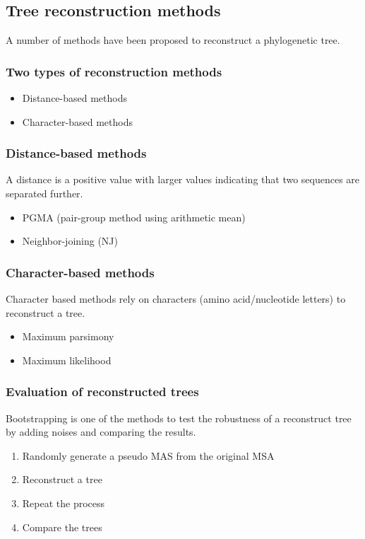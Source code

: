 %
%

%
%
\subsection{Tree reconstruction methods}
A number of methods have been proposed to reconstruct a phylogenetic tree.

%
%
\subsubsection*{Two types of reconstruction methods}
\begin{itemize}
\item Distance-based methods
\item Character-based methods
\end{itemize}

%
%
\subsubsection*{Distance-based methods}
A distance is a positive value with larger values indicating that two sequences are separated further. 

\begin{itemize}
\item PGMA (pair-group method using arithmetic mean)
\item Neighbor-joining  (NJ)
\end{itemize}

%
%
\subsubsection*{Character-based methods}
Character based methods rely on characters (amino acid/nucleotide letters) to reconstruct a tree.

\begin{itemize}
\item Maximum parsimony
\item Maximum likelihood
\end{itemize}

%
\subsubsection*{Evaluation of reconstructed trees}
Bootstrapping is one of the methods to test the robustness of a reconstruct tree by adding noises and comparing the results.
\begin{enumerate}
\item Randomly generate a pseudo MAS from the original MSA
\item Reconstruct a tree
\item Repeat the process
\item Compare the trees
\end{enumerate}

\bigskip 

%
